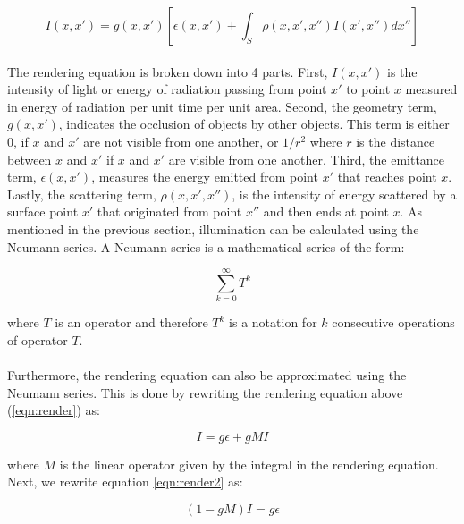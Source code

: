 \begin{equation}
I(x,x') = g(x,x')[\epsilon(x,x')+\int_{S} \rho(x,x',x'')I(x',x'')dx''] \label{eqn:render}
\end{equation}

\paragraph{}
The rendering equation is broken down into 4 parts.  First, $I(x,x')$ is the intensity of light or energy of radiation passing from point $x'$ to point $x$ measured in energy of radiation per unit time per unit area.  Second, the geometry term, $g(x,x')$, indicates the occlusion of objects by other objects.  This term is either $0$, if $x$ and $x'$ are not visible from one another, or $1/r^2$ where $r$ is the distance between $x$ and $x'$ if $x$ and $x'$ are visible from one another.  Third, the emittance term, $\epsilon(x,x')$, measures the energy emitted from point $x'$ that reaches point $x$.  Lastly, the scattering term, $\rho(x,x',x'')$, is the intensity of energy scattered by a surface point $x'$ that originated from point $x''$ and then ends at point $x$.  As mentioned in the previous section, illumination can be calculated using the Neumann series.  A Neumann series is a mathematical series of the form:

\begin{equation}
\sum_{k=0}^{\infty}T^k \label{eqn:neumann}
\end{equation}

where $T$ is an operator and therefore $T^k$ is a notation for $k$ consecutive operations of operator $T$. 

\paragraph{}
Furthermore, the rendering equation can also be approximated using the Neumann series.  This is done by rewriting the rendering equation above (\ref{eqn:render}) as:

\begin{equation}
I = g\epsilon +gMI \label{eqn:render2}
\end{equation}

where $M$ is the linear operator given by the integral in the rendering equation.  Next, we rewrite equation \ref{eqn:render2} as:

\begin{equation}
(1-gM)I = g\epsilon \label{eqn:render3}
\end{equation}

